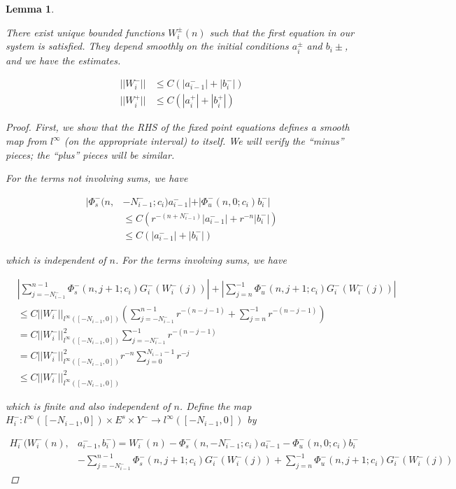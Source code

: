 \documentclass[12pt]{article}
\newtheorem{lemma}{Lemma}
\begin{document}
\begin{lemma}\label{inv1}

There exist unique bounded functions $W_i^\pm(n)$ such that the first equation in our system is satisfied. They depend smoothly on the initial conditions $a_i^\pm$ and $b_i\pm$, and we have the estimates.

\begin{align*}
||W_i^-|| &\leq C (|a_{i-1}^-| + |b_i^-|) \\
||W_i^+|| &\leq C (|a_i^+| + |b_i^+| )
\end{align*}

\begin{proof}
First, we show that the RHS of the fixed point equations defines a smooth map from $l^\infty$ (on the appropriate interval) to itself. We will verify the ``minus'' pieces; the ``plus'' pieces will be similar.

For the terms not involving sums, we have

\begin{align*}
|\Phi_s^-(n, &-N_{i-1}^-; c_i) a_{i-1}^-| + |\Phi_u^-(n, 0; c_i) b_i^-| \\
&\leq C ( r^{-(n + N_{i-1}^-)} |a_{i-1}^-| +  r^{-n}|b_i^-|) \\
&\leq C ( |a_{i-1}^-| + |b_i^-|) 
\end{align*}

which is independent of $n$. For the terms involving sums, we have

\begin{align*}
&\left| \sum_{j = -N_{i-1}^-}^{n-1} \Phi_s^-(n, j+1; c_i) G_i^-(W_i^-(j))\right| + \left|\sum_{j = n}^{-1} \Phi_u^-(n, j+1; c_i) G_i^-(W_i^-(j))\right| \\
&\leq C ||W_i^-||_{l^\infty([-N_{i-1}, 0])} \left( \sum_{j = -N_{i-1}^-}^{n-1} r^{-(n - j - 1)} + \sum_{j = n}^{-1} r^{-(n - j - 1)} \right) \\
&= C ||W_i^-||_{l^\infty([-N_{i-1}, 0])}^2 \sum_{j = -N_{i-1}^-}^{-1} r^{-(n - j - 1)} \\
&= C ||W_i^-||_{l^\infty([-N_{i-1}, 0])}^2 r^{-n} \sum_{j = 0}^{N_{i-1} - 1} r^{-j} \\
&\leq C ||W_i^-||_{l^\infty([-N_{i-1}, 0])}^2 
\end{align*}

which is finite and also independent of $n$. Define the map $H_i^-: l^\infty([-N_{i-1}, 0]) \times E^s \times Y^- \rightarrow l^\infty([-N_{i-1}, 0])$ by

\begin{align*}
H_i^-(W_i^-(n), &a_{i-1}^-, b_i^-) = W_i^-(n) - \Phi_s^-(n, -N_{i-1}^-; c_i) a_{i-1}^- - \Phi_u^-(n, 0; c_i) b_i^-  \\
&- \sum_{j = -N_{i-1}^-}^{n-1} \Phi_s^-(n, j+1; c_i) G_i^-(W_i^-(j)) + \sum_{j = n}^{-1} \Phi_u^-(n, j+1; c_i) G_i^-(W_i^-(j)) 
\end{align*}


\end{proof}
\end{lemma}
\end{document}
